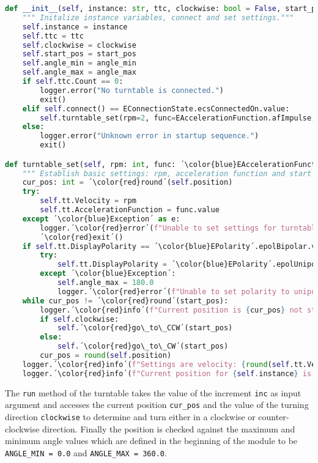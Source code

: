 \begin{lstlisting}[language=Python, caption=Method to establish settings for turntable and reach start position.]
def __init__(self, instance: str, ttc, clockwise: bool = False, start_pos: float = 0.0, angle_min: float = ANGLE_MIN, angle_max: float = ANGLE_MAX) -> None:
    """ Initalize instance variables, connect and set settings."""
    self.instance = instance
    self.ttc = ttc
    self.clockwise = clockwise
    self.start_pos = start_pos
    self.angle_min = angle_min
    self.angle_max = angle_max
    if self.ttc.Count == 0:
        logger.error("No turntable is connected.")
        exit()
    elif self.connect() == EConnectionState.ecsConnectedOn.value:
        self.turntable_set(rpm=2, func=EAccelerationFunction.afImpulse, start_pos=self.start_pos)
    else:
        logger.error("Unknown error in startup sequence.")
        exit()

def turntable_set(self, rpm: int, func: ´\color{blue}EAccelerationFunction´, start_pos: float) -> None:
    """ Establish basic settings: rpm, acceleration function and start position. """
    cur_pos: int = ´\color{red}round´(self.position)
    try:
        self.tt.Velocity = rpm
        self.tt.AccelerationFunction = func.value
    except ´\color{blue}Exception´ as e:
        logger.´\color{red}error´(f"Unable to set settings for turntable {self.instance}, exiting with error code {e}.")
        ´\color{red}exit´()
    if self.tt.DisplayPolarity == ´\color{blue}EPolarity´.epolBipolar.value:
        try:
            self.tt.DisplayPolarity = ´\color{blue}EPolarity´.epolUnipolar.value
        except ´\color{blue}Exception´:
            self.angle_max = 180.0
            logger.´\color{red}error´(f"Unable to set polarity to unipolar for turntable {self.instance}.")
    while cur_pos != ´\color{red}round´(start_pos):
        logger.´\color{red}info´(f"Current position is {cur_pos} not start position {round(start_pos)}. Moving {self.instance} to start position.")
        if self.clockwise:
            self.´\color{red}go\_to\_CCW´(start_pos)
        else:
            self.´\color{red}go\_to\_CW´(start_pos)
        cur_pos = round(self.position)
    logger.´\color{red}info´(f"Settings are velocity: {round(self.tt.Velocity)}, function: {EAccelerationFunction(self.tt.AccelerationFunction)}.")
    logger.´\color{red}info´(f"Current position for {self.instance} is {cur_pos}.")
\end{lstlisting}

The \verb+run+ method of the turntable takes the value of the increment \verb+inc+ as input argument and accesses the current position \verb+cur_pos+ and the value of the turning direction \verb+clockwise+ to determine and turn either in a clockwise or counter-clockwise direction. Finally the position is checked against the maximum and minimum angle values which are defined in the beginning of the module to be \verb+ANGLE_MIN = 0.0+ and \verb+ANGLE_MAX = 360.0+.

